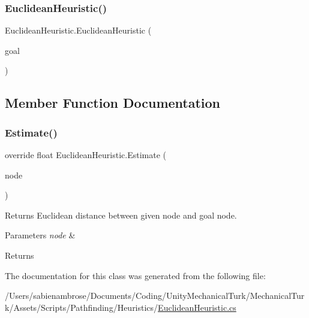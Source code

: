 \subsubsection{\texorpdfstring{Euclidean\+Heuristic()}{EuclideanHeuristic()}}
{\footnotesize\ttfamily Euclidean\+Heuristic.\+Euclidean\+Heuristic (\begin{DoxyParamCaption}\item[{\mbox{\hyperlink{struct_int_point}{Int\+Point}}}]{goal }\end{DoxyParamCaption})}



\subsection{Member Function Documentation}
\mbox{\label{class_euclidean_heuristic_a99dffc6647fe187d9b24f64c71f4e6a3}} 
\subsubsection{\texorpdfstring{Estimate()}{Estimate()}}
{\footnotesize\ttfamily override float Euclidean\+Heuristic.\+Estimate (\begin{DoxyParamCaption}\item[{\mbox{\hyperlink{struct_int_point}{Int\+Point}}}]{node }\end{DoxyParamCaption})}



Returns Euclidean distance between given node and goal node. 


\begin{DoxyParams}{Parameters}
{\em node} & \\
\hline
\end{DoxyParams}
\begin{DoxyReturn}{Returns}

\end{DoxyReturn}


The documentation for this class was generated from the following file\+:\begin{DoxyCompactItemize}
\item 
/\+Users/sabienambrose/\+Documents/\+Coding/\+Unity\+Mechanical\+Turk/\+Mechanical\+Turk/\+Assets/\+Scripts/\+Pathfinding/\+Heuristics/\mbox{\hyperlink{_euclidean_heuristic_8cs}{Euclidean\+Heuristic.\+cs}}\end{DoxyCompactItemize}
